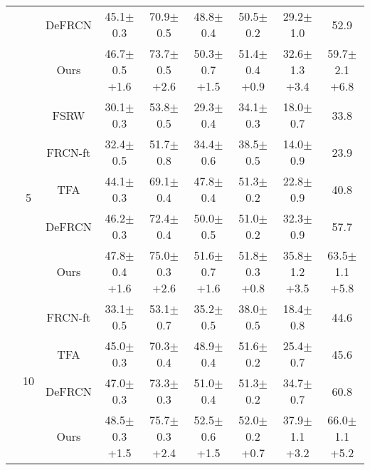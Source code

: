 \documentclass{article}
\begin{document}
\begin{table}[hbt!]
\begin{adjustbox}{width=0.79\textwidth}
{\begin{tabular}{c|c|c|ccc|c|cc}
         &&DeFRCN \cite{defrcn}&45.1$\pm$0.3&70.9$\pm$0.5&48.8$\pm$0.4&50.5$\pm$0.2&29.2$\pm$1.0&52.9\\
         && \cellcolor{gray!30}Ours&\cellcolor{gray!30}46.7$\pm$0.5 {\scriptsize \color{red}+1.6}&\cellcolor{gray!30}73.7$\pm$0.5 {\scriptsize \color{red}+2.6}&\cellcolor{gray!30}50.3$\pm$0.7 {\scriptsize \color{red}+1.5}&\cellcolor{gray!30}51.4$\pm$0.4 {\scriptsize \color{red}+0.9}&\cellcolor{gray!30}32.6$\pm$1.3 {\scriptsize \color{red}+3.4}&\cellcolor{gray!30}59.7$\pm$2.1 {\scriptsize \color{red}+6.8}\\
         \cmidrule{2-9}
         &\multirow{5}{*}{5}&FSRW \cite{metayolo} &30.1$\pm$0.3&53.8$\pm$0.5&29.3$\pm$0.4&34.1$\pm$0.3&18.0$\pm$0.7&33.8  \\
         &&FRCN-ft \cite{metarcnn}&32.4$\pm$0.5&51.7$\pm$0.8&34.4$\pm$0.6&38.5$\pm$0.5&14.0$\pm$0.9&23.9\\
         &&TFA \cite{tfa}&44.1$\pm$0.3&69.1$\pm$0.4&47.8$\pm$0.4&51.3$\pm$0.2&22.8$\pm$0.9&40.8\\
         &&DeFRCN \cite{defrcn}&46.2$\pm$0.3&72.4$\pm$0.4&50.0$\pm$0.5&51.0$\pm$0.2&32.3$\pm$0.9&57.7\\
         && \cellcolor{gray!30}Ours&\cellcolor{gray!30}47.8$\pm$0.4 {\scriptsize \color{red}+1.6}&\cellcolor{gray!30}75.0$\pm$0.3 {\scriptsize \color{red}+2.6}&\cellcolor{gray!30}51.6$\pm$0.7 {\scriptsize \color{red}+1.6}&\cellcolor{gray!30}51.8$\pm$0.3 {\scriptsize \color{red}+0.8}&\cellcolor{gray!30}35.8$\pm$1.2 {\scriptsize \color{red}+3.5}&\cellcolor{gray!30}63.5$\pm$1.1 {\scriptsize \color{red}+5.8}\\
         \cmidrule{2-9}
         &\multirow{5}{*}{10}&FRCN-ft \cite{metarcnn}&33.1$\pm$0.5&53.1$\pm$0.7&35.2$\pm$0.5&38.0$\pm$0.5&18.4$\pm$0.8&44.6\\
         &&TFA \cite{tfa}&45.0$\pm$0.3&70.3$\pm$0.4&48.9$\pm$0.4&51.6$\pm$0.2&25.4$\pm$0.7&45.6\\
         &&DeFRCN \cite{defrcn}&47.0$\pm$0.3&73.3$\pm$0.3&51.0$\pm$0.4&51.3$\pm$0.2&34.7$\pm$0.7&60.8\\
         && \cellcolor{gray!30}Ours&\cellcolor{gray!30}48.5$\pm$0.3 {\scriptsize \color{red}+1.5}&\cellcolor{gray!30}75.7$\pm$0.3 {\scriptsize \color{red}+2.4}&\cellcolor{gray!30}52.5$\pm$0.6 {\scriptsize \color{red}+1.5}&\cellcolor{gray!30}52.0$\pm$0.2 {\scriptsize \color{red}+0.7}&\cellcolor{gray!30}37.9$\pm$1.1 {\scriptsize \color{red}+3.2}&\cellcolor{gray!30}66.0$\pm$1.1 {\scriptsize \color{red}+5.2}\\
         \midrule
    \end{tabular}
    }
    \end{adjustbox}

    \label{tab:gfsod}
\end{table}
\end{document}
